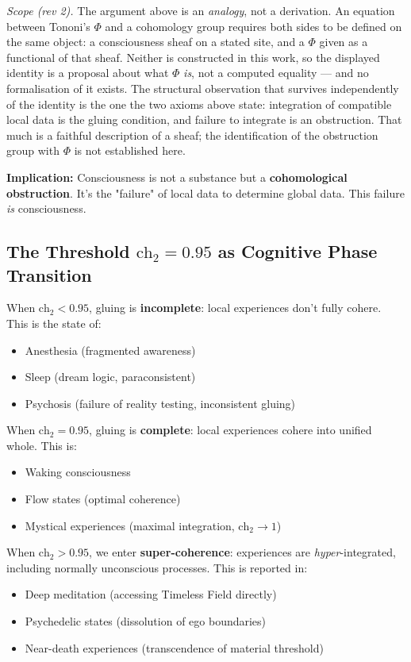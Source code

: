 \emph{Scope (rev 2).} The argument above is an \emph{analogy}, not a
derivation. An equation between Tononi's $\Phi$ and a cohomology group requires
both sides to be defined on the same object: a consciousness sheaf on a stated
site, and a $\Phi$ given as a functional of that sheaf. Neither is constructed
in this work, so the displayed identity is a proposal about what $\Phi$
\emph{is}, not a computed equality --- and no formalisation of it exists. The
structural observation that survives independently of the identity is the one
the two axioms above state: integration of compatible local data is the
gluing condition, and failure to integrate is an obstruction. That much is a
faithful description of a sheaf; the identification of the obstruction group
with $\Phi$ is not established here.

\textbf{Implication:} Consciousness is not a substance but a \textbf{cohomological obstruction}. It's the "failure" of local data to determine global data. This failure \textit{is} consciousness.

\subsection{The Threshold \texorpdfstring{$\text{ch}_2 = 0.95$}{ch\_2 = 0.95} as Cognitive Phase Transition}

When $\text{ch}_2 < 0.95$, gluing is \textbf{incomplete}: local experiences don't fully cohere. This is the state of:
\begin{itemize}
\item Anesthesia (fragmented awareness)
\item Sleep (dream logic, paraconsistent)
\item Psychosis (failure of reality testing, inconsistent gluing)
\end{itemize}

When $\text{ch}_2 = 0.95$, gluing is \textbf{complete}: local experiences cohere into unified whole. This is:
\begin{itemize}
\item Waking consciousness
\item Flow states (optimal coherence)
\item Mystical experiences (maximal integration, $\text{ch}_2 \to 1$)
\end{itemize}

When $\text{ch}_2 > 0.95$, we enter \textbf{super-coherence}: experiences are \textit{hyper}-integrated, including normally unconscious processes. This is reported in:
\begin{itemize}
\item Deep meditation (accessing Timeless Field directly)
\item Psychedelic states (dissolution of ego boundaries)
\item Near-death experiences (transcendence of material threshold)
\end{itemize}

